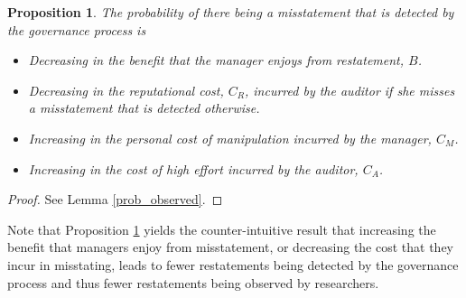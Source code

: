\documentclass[11pt]{amsart}
\newtheorem{proposition}[theorem]{Proposition}
\begin{document}
\begin{proposition}\label{cool_result}
The probability of there being a misstatement that is detected by the governance process is 
\begin{itemize}
\item Decreasing in the benefit that the manager enjoys from restatement, $B$.
\item Decreasing in the reputational cost, $C_R$, incurred by the auditor if she misses a misstatement that is detected otherwise.
\item Increasing in the personal cost of manipulation incurred by the manager, $C_M$.
\item Increasing in the cost of high effort incurred by the auditor, $C_A$.
\end{itemize}
\end{proposition}

\begin{proof}
See Lemma \ref{prob_observed}. 
\end{proof}

Note that Proposition \ref{cool_result} yields the counter-intuitive result that increasing the benefit that managers enjoy from misstatement, or decreasing the cost that they incur in misstating, leads to fewer restatements being detected by the governance process and thus fewer restatements being observed by researchers.






%
\end{document}
